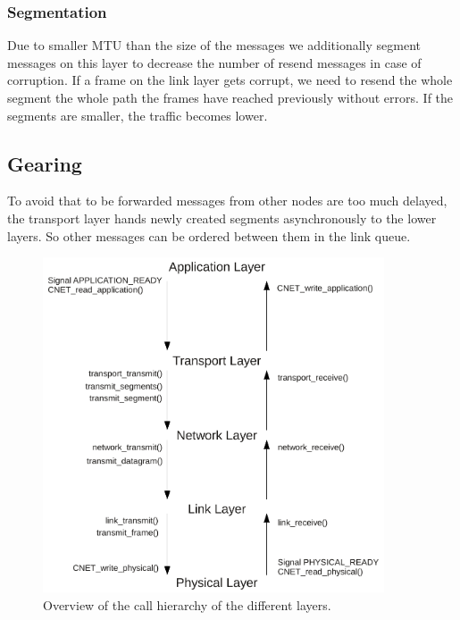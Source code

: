   \subsubsection{Segmentation}
  Due to smaller MTU than the size of the messages we additionally segment messages on this layer to decrease the number of resend messages in case of corruption. If a frame on the link layer gets corrupt, we need to resend the whole segment the whole path the frames have reached previously without errors. If the segments are smaller, the traffic becomes lower.

  \subsection{Gearing}
  To avoid that to be forwarded messages from other nodes are too much delayed, the transport layer hands newly created segments asynchronously to the lower layers. So other messages can be ordered between them in the link queue.

  \begin{figure}[p]
    \centering
    \includegraphics[width=0.9\textwidth]{images/flowgraph_overview.pdf}
    \caption[Overview Layers]{ Overview of the call hierarchy of the different layers.}
    \label{fig:overview-layers}
  \end{figure}

  \newpage

